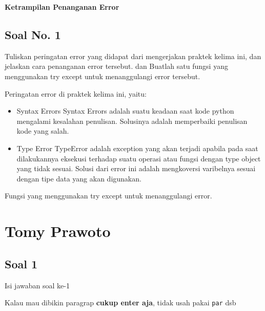 \hfill \break
{\Large \textbf{Ketrampilan Penanganan Error}}

\subsection{Soal No. 1}
Tuliskan  peringatan  error  yang  didapat  dari  mengerjakan  praktek  kelima  ini, dan  jelaskan  cara  penanganan  error  tersebut.   dan  Buatlah  satu  fungsi  yang menggunakan try except untuk menanggulangi error tersebut.

\hfill \break
Peringatan error di praktek kelima ini, yaitu:
\begin{itemize}
	\item Syntax Errors
	Syntax Errors adalah suatu keadaan saat kode python mengalami kesalahan penulisan. Solusinya adalah memperbaiki penulisan kode yang salah.
		
	\item Type Error
	TypeError adalah exception yang akan terjadi apabila pada saat dilakukannya eksekusi terhadap suatu operasi atau fungsi dengan type object yang tidak sesuai. Solusi dari error ini adalah mengkoversi varibelnya sesuai dengan tipe data yang akan digunakan.
\end{itemize}

\hfill \break
Fungsi yang menggunakan try except untuk menanggulangi error.




\section{Tomy Prawoto}
\subsection{Soal 1}
Isi jawaban soal ke-1

Kalau mau dibikin paragrap \textbf{cukup enter aja}, tidak usah pakai \verb|par| dsb


